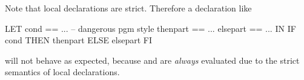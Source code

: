 \important Note that local declarations are strict. Therefore a
declaration like 
\begin{prog}
        LET cond     == ...           -- dangerous pgm style
            thenpart == ...
            elsepart == ...
        IN IF cond THEN thenpart ELSE elsepart FI
\end{prog}

\noindent will not behave as expected, because  and
 are {\em always\/}  evaluated  due to the strict semantics
of local declarations.


